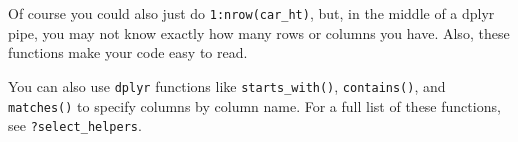 \documentclass[]{article}
\newenvironment{Shaded}{\begin{snugshade}}{\end{snugshade}}
\newcommand{\KeywordTok}[1]{\textcolor[rgb]{0.13,0.29,0.53}{\textbf{#1}}}
\newcommand{\StringTok}[1]{\textcolor[rgb]{0.31,0.60,0.02}{#1}}
\newcommand{\OperatorTok}[1]{\textcolor[rgb]{0.81,0.36,0.00}{\textbf{#1}}}
\newcommand{\NormalTok}[1]{#1}
\begin{document}
\FloatBarrier

Of course you could also just do \texttt{1:nrow(car\_ht)}, but, in the
middle of a dplyr pipe, you may not know exactly how many rows or
columns you have. Also, these functions make your code easy to read.

You can also use \texttt{dplyr} functions like \texttt{starts\_with()},
\texttt{contains()}, and \texttt{matches()} to specify columns by column
name. For a full list of these functions, see \texttt{?select\_helpers}.

\begin{Shaded}
\end{Shaded}
\end{document}
